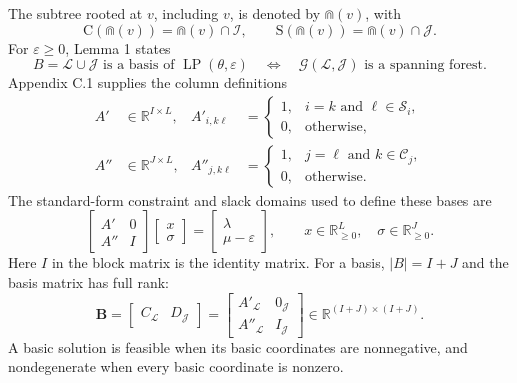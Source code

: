 \documentclass{article}
\begin{document}
The subtree rooted at $v$, including $v$, is denoted by $\Cap(v)$, with
\[
\mathrm C(\Cap(v))=\Cap(v)\cap\mathcal I,\qquad
\mathrm S(\Cap(v))=\Cap(v)\cap\mathcal J.
\]
For $\varepsilon\geq0$, Lemma 1 states
\[
B=\mathscr L\cup\mathscr J\text{ is a basis of }\operatorname{LP}(\theta,\varepsilon)
\quad\Longleftrightarrow\quad
\mathcal G(\mathscr L,\mathscr J)\text{ is a spanning forest}.
\]
Appendix C.1 supplies the column definitions
\begin{align}
A'&\in\mathbb R^{I\times L},&
A'_{i,k\ell}&=\begin{cases}1,&i=k\text{ and }\ell\in\mathcal S_i,\\0,&\text{otherwise},\end{cases}\tag{112}\\
A''&\in\mathbb R^{J\times L},&
A''_{j,k\ell}&=\begin{cases}1,&j=\ell\text{ and }k\in\mathcal C_j,\\0,&\text{otherwise}.\end{cases}\tag{113}
\end{align}
The standard-form constraint and slack domains used to define these bases are
\begin{equation}
\begin{bmatrix}A'&0\\A''&I\end{bmatrix}
\begin{bmatrix}x\\\sigma\end{bmatrix}
=\begin{bmatrix}\lambda\\\mu-\varepsilon\end{bmatrix},
\qquad x\in\mathbb R_{\geq0}^{L},\quad\sigma\in\mathbb R_{\geq0}^{J}.
\tag{111b}
\end{equation}
Here $I$ in the block matrix is the identity matrix. For a basis, $|B|=I+J$ and the basis matrix has full rank:
\begin{equation}
\mathbf B=
\begin{bmatrix}C_{\mathscr L}&D_{\mathscr J}\end{bmatrix}
=\begin{bmatrix}A'_{\mathscr L}&0_{\mathscr J}\\
A''_{\mathscr L}&I_{\mathscr J}\end{bmatrix}
\in\mathbb R^{(I+J)\times(I+J)}.
\tag{114}
\end{equation}
A basic solution is feasible when its basic coordinates are nonnegative, and nondegenerate when every basic coordinate is nonzero.
\end{document}
